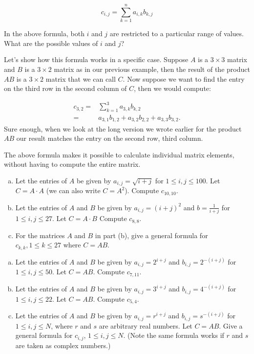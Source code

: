 \[ {c}_{i,j}= \sum_{k=1}^n a_{i,k} b_{k,j} \]


\begin{exercise}{}
In the above formula, both $i$ and $j$ are restricted to a particular range of values.  
What are the possible values of $i$ and $j$?
\end{exercise} 

Let's show how this formula works in a specific case. Suppose ${A}$ is a $3 \times 3$ matrix and ${B}$ is a $3 \times 2$ matrix as in our previous example, then the result of the product ${A} {B}$ is a $3 \times 2 $ matrix that we can call ${C}$.  Now suppose we want to find the entry on the third row in the second column of ${C}$, then we would compute:

\begin{align*}
{c}_{3,2} =& \sum_{k=1}^3 a_{3,k} b_{k,2} \\
=& a_{3,1} b_{1,2} + a_{3,2} b_{2,2} + a_{3,3} b_{3,2}.  
\end{align*}
Sure enough, when we look at the long version we wrote earlier for the product ${AB}$ our result matches the entry on the second row, third column.

The above formula makes it possible to calculate individual matrix elements, without having to compute the entire matrix.

\begin{exercise}{}
\begin{enumerate}[(a)]
\item
Let the entries of $A$ be given by $a_{i,j} = \sqrt{i+j}$ for $1 \le i,j \le 100$. Let $C = A\cdot A$ (we can also write $C=A^2$). Compute $c_{10,10}$.
\item
Let the entries of $A$ and $B$ be given by $a_{i,j} = (i+j)^2$ and $b= \frac{1}{i+j}$ for $1 \le i,j \le 27$. Let $C = A\cdot B$ Compute $c_{8,8}$.
\item
For the matrices $A$ and $B$ in part (b), give a general formula for $c_{k,k}, 1 \le k \le 27$ where $C=AB$.
\end{enumerate}
\end{exercise}

\begin{exercise}{}
\begin{enumerate}[(a)]
\item
Let the entries of $A$ and $B$ be given by $a_{i,j} =2^{i+j}$ and $b_{i,j} =2^{-(i+j)}$ for $1 \le i,j \le 50$. Let $C = AB$.  Compute $c_{7,11}$.
\item
Let the entries of $A$ and $B$ be given by $a_{i,j} =3^{i+j}$ and $b_{i,j} =4^{-(i+j)}$ for $1 \le i,j \le 22$. Let $C = AB$.  Compute $c_{5,4}$.
\item
Let the entries of $A$ and $B$ be given by $a_{i,j} =r^{i+j}$ and $b_{i,j} =s^{-(i+j)}$ for $1 \le i,j \le N$, where $r$ and $s$ are arbitrary real numbers. Let $C = AB$.  Give a general formula for $c_{i,j}$, $1\le i,j \le N$. (Note the same formula works if $r$ and $s$ are taken as complex numbers.) 
\end{enumerate}
\end{exercise}

